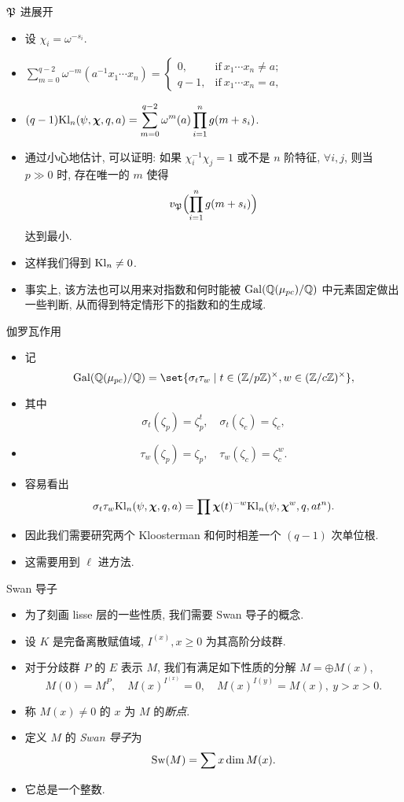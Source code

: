 \documentclass[aspectratio=169,handout]{ctexbeamer}
\newcommand\bchi{{\boldsymbol\chi}}
\begin{document}
\begin{frame}{${\mathfrak{P}}$ 进展开}
	\begin{itemize}
		\item 设 $\chi_i=\omega^{-s_i}$.
		\item $\displaystyle
				\sum_{m=0}^{q-2} \omega^{-m}(a^{-1}x_1\cdots x_n)
				=\begin{cases}
					0,&\text{if}\ x_1\cdots x_n\neq a;\\
					q-1,&\text{if}\ x_1\cdots x_n= a,
				\end{cases}$
		\item $\displaystyle
				(q-1)\Kl_n(\psi,\bchi,q,a)
				=\sum_{m=0}^{q-2}\omega^m(a)\prod_{i=1}^n g(m+s_i)$.
		\item 通过小心地估计, 可以证明: 如果 $\chi_i^{-1}\chi_j=1$ 或不是 $n$ 阶特征, $\forall i,j$, 则当 $p\gg0$ 时, 存在唯一的 $m$ 使得 
		\[
			v_{\mathfrak{P}}\Bigl(\prod_{i=1}^n g(m+s_i)\Bigr)
		\]
		达到最小.
		\item 这样我们得到 ${\mathrm{Kl}}_n\neq 0$.
		\item 事实上, 该方法也可以用来对指数和何时能被 ${\mathrm{Gal}}({\mathbb{Q}}(\mu_{pc})/{\mathbb{Q}})$ 中元素固定做出一些判断, 从而得到特定情形下的指数和的生成域.
	\end{itemize}
\end{frame}


\begin{frame}{伽罗瓦作用}
	\begin{itemize}
		\item 记
		\[
			\Gal(\BQ(\mu_{pc})/\BQ)
			=\set{\sigma_t\tau_w\mid t\in (\BZ/p\BZ)^\times,w\in(\BZ/c\BZ)^\times},
		\]
		\item 其中
		\[
			\sigma_t(\zeta_p)=\zeta_p^t,\quad
			\sigma_t(\zeta_c)=\zeta_c,
		\]
		\item 
		\[
			\tau_w(\zeta_p)=\zeta_p,\quad
			\tau_w(\zeta_c)=\zeta_c^w.
		\]
		\item 容易看出
		\[
			\sigma_t\tau_w\Kl_n(\psi,\bchi,q,a)
			=\prod\bchi(t)^{-w}\Kl_n(\psi,\bchi^w,q,at^n).
		\]
		\item 因此我们需要研究两个 Kloosterman 和何时相差一个 $(q-1)$ 次单位根.
		\item 这需要用到 $\ell$ 进方法.
	\end{itemize}
\end{frame}


\begin{frame}{Swan 导子}
	\begin{itemize}
		\item 为了刻画 lisse 层的一些性质, 我们需要 Swan 导子的概念.
		\item 设 $K$ 是完备离散赋值域, $I^{(x)},x\ge 0$ 为其高阶分歧群. 
		\item 对于分歧群 $P$ 的 $E$ 表示 $M$, 我们有满足如下性质的分解 $M=\oplus M(x)$, 
		\[
			M(0)=M^P,\quad
			M(x)^{I^{(x)}}=0,\quad
			M(x)^{I(y)}=M(x), \ y>x>0.
		\]
		\item 称 $M(x)\neq 0$ 的 $x$ 为 $M$ 的\emph{断点}.
		\item 定义 $M$ 的 \emph{Swan 导子}为
		\[
			{\mathrm{Sw}}(M)=\sum x\dim M(x).
		\]
		\item 它总是一个整数.
	\end{itemize}
\end{frame}
\end{document}
